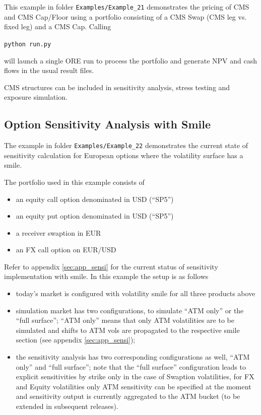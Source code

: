 \documentclass[12pt, a4paper]{article}
\begin{document}
This example in folder {\tt Examples/Example\_21} demonstrates the pricing of CMS and CMS Cap/Floor using a portfolio consisting of a CMS Swap (CMS leg vs. fixed leg) and a CMS Cap. Calling

\medskip
\centerline{\tt python run.py}

\medskip
will launch a single ORE run to process the portfolio and generate NPV and cash flows in the usual result files. 

\medskip
CMS structures can be included in sensitivity analysis, stress testing and exposure simulation. 

\subsection{Option Sensitivity Analysis with Smile}%

The example in folder {\tt Examples/Example\_22} demonstrates the current state of sensitivity calculation for European options where the volatility surface has a smile. 

\medskip
The portfolio used in this example consists of
\begin{itemize}
	\item an equity call option denominated in USD (``SP5'')
	\item an equity put option denominated in USD (``SP5'')
	\item a receiver swaption in EUR
	\item an FX call option on EUR/USD
\end{itemize}

\medskip
Refer to appendix \ref{sec:app_sensi} for the current status of sensitivity implementation with smile. In this example the setup is as follows
\begin{itemize}
\item today's market is configured with volatility smile for all three products above
\item simulation market has two configurations, to simulate ``ATM only'' or the ``full surface''; ``ATM only'' means that only ATM volatilities are to be simulated and shifts to ATM vols are propagated to the respective smile section (see appendix \ref{sec:app_sensi});  
\item the sensitivity analysis has two corresponding configurations as well, ``ATM only'' and ``full surface''; note that the ``full surface'' configuration leads to explicit sensitivities by strike only in the case of Swaption volatilities, for FX and Equity volatilities only ATM sensitivity can be specified at the moment and sensitivity output is currently aggregated to the ATM bucket (to be extended in subsequent releases).
\end{itemize}
\end{document}
